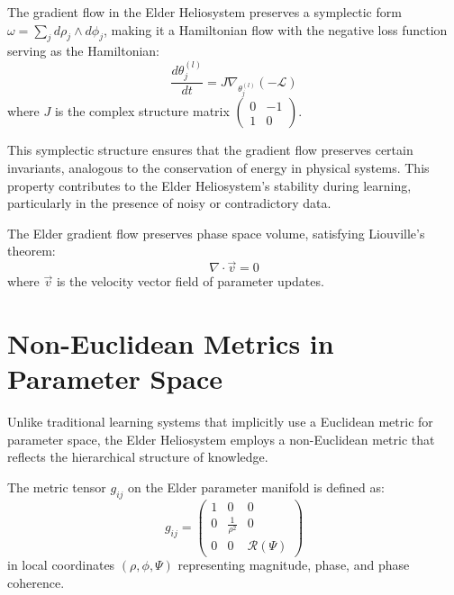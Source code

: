 \begin{theorem}
The gradient flow in the Elder Heliosystem preserves a symplectic form $\omega = \sum_j d\rho_j \wedge d\phi_j$, making it a Hamiltonian flow with the negative loss function serving as the Hamiltonian:
\begin{equation}
\frac{d\theta^{(l)}_j}{dt} = J \nabla_{\theta^{(l)}_j} (-\mathcal{L})
\end{equation}
where $J$ is the complex structure matrix $\begin{pmatrix} 0 & -1 \\ 1 & 0 \end{pmatrix}$.
\end{theorem}

This symplectic structure ensures that the gradient flow preserves certain invariants, analogous to the conservation of energy in physical systems. This property contributes to the Elder Heliosystem's stability during learning, particularly in the presence of noisy or contradictory data.

\begin{corollary}
The Elder gradient flow preserves phase space volume, satisfying Liouville's theorem:
\begin{equation}
\nabla \cdot \vec{v} = 0
\end{equation}
where $\vec{v}$ is the velocity vector field of parameter updates.
\end{corollary}

\section{Non-Euclidean Metrics in Parameter Space}

Unlike traditional learning systems that implicitly use a Euclidean metric for parameter space, the Elder Heliosystem employs a non-Euclidean metric that reflects the hierarchical structure of knowledge.

\begin{definition}
The metric tensor $g_{ij}$ on the Elder parameter manifold is defined as:
\begin{equation}
g_{ij} = \begin{pmatrix} 
1 & 0 & 0 \\
0 & \frac{1}{\rho^2} & 0 \\
0 & 0 & \mathcal{R}(\Psi)
\end{pmatrix}
\end{equation}
in local coordinates $(\rho, \phi, \Psi)$ representing magnitude, phase, and phase coherence.
\end{definition}

